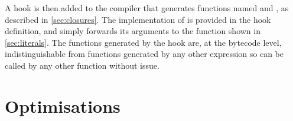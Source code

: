 \documentclass[dissertation.tex]{subfiles}
\begin{document}
{{        A hook is then added to the compiler that generates functions named  and
        , as described in \ref{sec:closures}. The implementation of
         is provided in the hook definition, and simply forwards its arguments to the
         function shown in \ref{sec:literals}. The functions generated by the hook are, at the
        bytecode level, indistinguishable from functions generated by any other expression so can be called by any
        other function without issue.



    }
}
\section{Optimisations}
\end{document}
